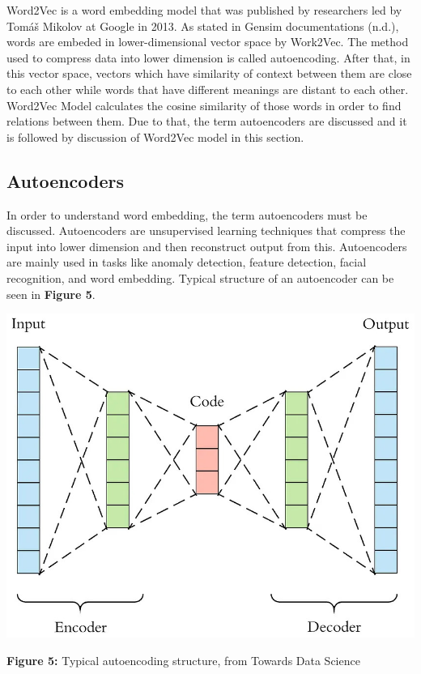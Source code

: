 \documentclass[man]{apa7}
\begin{document}
Word2Vec is a word embedding model that was published by researchers led by Tomáš Mikolov at Google in 2013. As stated in Gensim documentations (n.d.), words are embeded in lower-dimensional vector space by Work2Vec. The method used to compress data into lower dimension is called autoencoding. After that, in this vector space, vectors which have similarity of context between them are close to each other while words that have different meanings are distant to each other. Word2Vec Model calculates the cosine similarity of those words in order to find relations between them. Due to that, the term autoencoders are discussed and it is followed by discussion of Word2Vec model in this section.

\subsection{Autoencoders}

In order to understand word embedding, the term autoencoders must be discussed. Autoencoders are unsupervised learning techniques that compress the input into lower dimension and then reconstruct output from this. Autoencoders are mainly used in tasks like anomaly detection, feature detection, facial recognition, and word embedding. Typical structure of an autoencoder can be seen in \textbf{Figure 5}.\\

\begin{center}

\includegraphics[scale=0.4]{autoencoding.jpg}

\textbf{Figure 5:} Typical autoencoding structure, from Towards Data Science\\[2\baselineskip]

\end{center}
\end{document}

